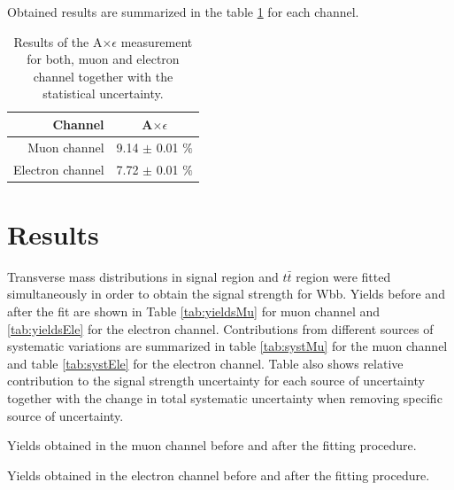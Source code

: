 Obtained results are summarized in the table \ref{tab:AE} for each channel.

\begin{table}[!htb]
\begin{center}
   \begin{tabular} {r c} \hline \hline
        Channel         & A$\times \epsilon$ \\
        \hline
        Muon channel         & 9.14 $\pm$ 0.01 $\%$ \\
        Electron channel     & 7.72 $\pm$ 0.01 $\%$ \\
        \hline\hline
   \end{tabular}
\caption{Results of the A$\times \epsilon$ measurement for both, muon and electron channel together with the statistical uncertainty.}
\label{tab:AE}
\end{center}
\end{table}




\section{Results}
\label{sec:res}

Transverse mass distributions in signal region and $t\bar{t}$ region were fitted simultaneously in order to obtain the signal strength for Wbb. Yields before and after the fit are shown in Table \ref{tab:yieldsMu} for muon channel and \ref{tab:yieldsEle} for the electron channel. Contributions from different sources of systematic variations are summarized in table \ref{tab:systMu} for the muon channel and table \ref{tab:systEle} for the electron channel. Table also shows relative contribution to the signal strength uncertainty for each source of uncertainty together with the change in total systematic uncertainty when removing specific source of uncertainty. 

\begin{table}[h!]
\caption{Yields obtained in the muon channel before and after the fitting procedure.}
\label{tab:yieldsMu}

\end{table}
\begin{table}[h!]
\caption{Yields obtained in the electron channel before and after the fitting procedure.}
\label{tab:yieldsEle}

\end{table}

